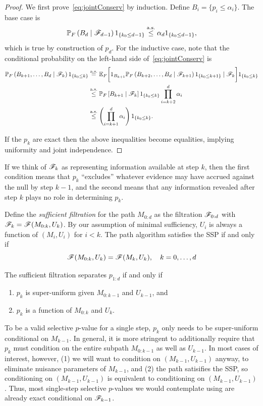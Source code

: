 \documentclass{article}
\begin{document}
\begin{proof}
  We first prove~\eqref{eq:jointConserv}
  by induction. Define $B_i = \{p_i \leq \alpha_i\}$. 
  The base case is
  \[
  \mathbb{P}_F\left(B_d \mid \mathscr{F}_{d-1}\right)1_{\{k_0 \leq d-1\}} \overset{\textrm{a.s.}}{\leq} \alpha_d
1_{\{k_0 \leq d-1\}},
  \]
  which is true by construction of $p_d$. 
  For the inductive case, note that the
  conditional probability on the left-hand side
  of~\eqref{eq:jointConserv} is
  \begin{align*}
    \mathbb{P}_F\left(B_{k+1}, \ldots, B_d
      \mid \mathscr{F}_k\right)1_{\{k_0 \leq k\}} 
    &\overset{\textrm{a.s.}}{=} \mathbb{E}_F\bigg[ 1_{B_{k+1}} 
    \mathbb{P}_F\left(B_{k+2}, \ldots, B_d
      \mid \mathscr{F}_{k+1}\right)1_{\{k_0 \leq k+1\}}
    \mid \mathscr{F}_k\bigg]1_{\{k_0 \leq k\}}\\
    &\overset{\textrm{a.s.}}{\leq} \mathbb{P}_F\left[ B_{k+1}
      \mid \mathscr{F}_k\right]1_{\{k_0 \leq k\}}\prod_{i=k+2}^d \alpha_i \\
    &\overset{\textrm{a.s.}}{\leq} \left(\prod_{i=k+1}^d \alpha_i \right)1_{\{k_0 \leq k\}} .
  \end{align*}

  If the $p_k$ are exact then the above 
  inequalities become equalities, implying uniformity and joint independence.
\end{proof}

If we think of $\mathscr{F}_k$ as representing information available at step $k$, then the first condition means that $p_k$ ``excludes'' whatever evidence may have accrued against the null by step $k-1$, and the second means that any information revealed after step $k$ plays no role in determining $p_k$.

Define the {\em sufficient filtration} for the path $M_{0:d}$ as the filtration $\mathscr{F}_{0:d}$ with $\mathscr{F}_k = \mathscr{F}(M_{0:k}, U_k)$. By our assumption of minimal sufficiency, $U_i$ is always a function of $(M_i, U_i)$ for $i<k$. The path algorithm satisfies the SSP if and only if
\begin{equation}\label{eq:SSP}
  \mathscr{F}(M_{0:k}, U_k) = \mathscr{F}(M_k, U_k), \quad k=0,\ldots, d
\end{equation}

The sufficient filtration separates $p_{1:d}$ if and only if 
\begin{enumerate}
\item $p_k$ is super-uniform given $M_{0:k-1}$ and $U_{k-1}$, and 
\item $p_k$ is a function of $M_{0:k}$ and $U_k$.
\end{enumerate}

To be a valid selective $p$-value for a single step, $p_k$ only needs to be super-uniform conditional on $M_{k-1}$. In general, it is more stringent to additionally require that $p_k$ must condition on the entire subpath $M_{0:k-1}$ as well as $U_{k-1}$. In most cases of interest, however, (1) we will want to condition on $(M_{k-1}, U_{k-1})$ anyway, to eliminate nuisance parameters of $M_{k-1}$, and (2) the path satisifies the SSP, so conditioning on $(M_{k-1}, U_{k-1})$ is equivalent to conditioning on $(M_{k-1}, U_{k-1})$. Thus, most single-step selective $p$-values we would contemplate using are already exact conditional on $\mathscr{F}_{k-1}$.
\end{document}
